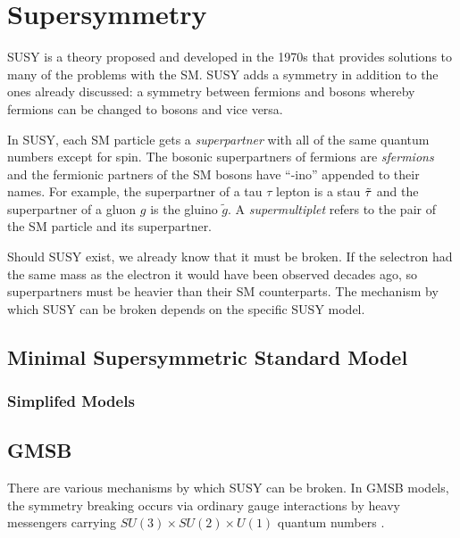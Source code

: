 

\section{Supersymmetry}

\acf{SUSY} is a theory proposed and developed in the 1970s \cite{susy-found-1,susy-found-2,susy-found-3} that provides solutions to many of the problems with the \ac{SM}. \ac{SUSY} adds a symmetry in addition to the ones already discussed: a symmetry between fermions and bosons whereby fermions can be changed to bosons and vice versa. 

In \ac{SUSY}, each \ac{SM} particle gets a \emph{superpartner} with all of the same quantum numbers except for spin. The bosonic superpartners of fermions are \emph{sfermions} and the fermionic partners of the \ac{SM} bosons have ``-ino'' appended to their names. For example, the superpartner of a tau $\tau$ lepton is a stau $\tilde{\tau}$ and the superpartner of a gluon $g$ is the gluino $\tilde{g}$. A \emph{supermultiplet} refers to the pair of the \ac{SM} particle and its superpartner.

Should \ac{SUSY} exist, we already know that it must be broken. If the selectron had the same mass as the electron it would have been observed decades ago, so superpartners must be heavier than their \ac{SM} counterparts. The mechanism by which \ac{SUSY} can be broken depends on the specific \ac{SUSY} model.

\subsection{Minimal Supersymmetric Standard Model}


\subsubsection{Simplifed Models}


\subsection{GMSB}
\label{sec:gmsb}

There are various mechanisms by which \ac{SUSY} can be broken. In \acf{GMSB} models, the symmetry breaking occurs via ordinary gauge interactions by heavy messengers carrying $SU(3) \times SU(2) \times U(1)$ quantum numbers \cite{gmsb-lep,Dimopoulos_1996,Ambrosanio_1997}. 



